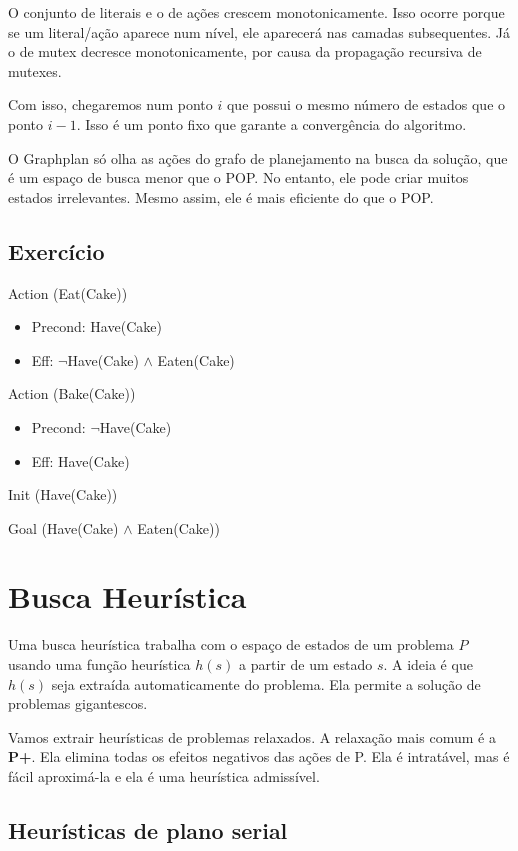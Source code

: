 \documentclass[12pt,letterpaper]{article}
\begin{document}
	O conjunto de literais e o de ações crescem monotonicamente. Isso ocorre porque se um literal/ação aparece num nível, ele aparecerá nas camadas subsequentes. Já o de mutex decresce monotonicamente, por causa da propagação recursiva de mutexes.
	
	Com isso, chegaremos num ponto $i$ que possui o mesmo número de estados que o ponto $i-1$. Isso é um ponto fixo que garante a convergência do algoritmo.
	
	O Graphplan só olha as ações do grafo de planejamento na busca da solução, que é um espaço de busca menor que o POP. No entanto, ele pode criar muitos estados irrelevantes. Mesmo assim, ele é mais eficiente do que o POP.
	
	\subsection*{Exercício}
	
	Action (Eat(Cake))
	\begin{itemize}
		\item Precond: Have(Cake)
		\item Eff: $\lnot$Have(Cake) $\land$ Eaten(Cake)
	\end{itemize}
	
	Action (Bake(Cake))
	\begin{itemize}
		\item Precond: $\lnot$Have(Cake)
		\item Eff: Have(Cake)
	\end{itemize}
	
	Init (Have(Cake))
	
	Goal (Have(Cake) $\land$ Eaten(Cake))
		
	\section*{Busca Heurística}
	
	Uma busca heurística trabalha com o espaço de estados de um problema $P$ usando uma função heurística $h(s)$ a partir de um estado $s$. A ideia é que $h(s)$ seja extraída automaticamente do problema. Ela permite a solução de problemas gigantescos. 
	
	Vamos extrair heurísticas de problemas relaxados. A relaxação mais comum é a \textbf{P+}. Ela elimina todas os efeitos negativos das ações de P. Ela é intratável, mas é fácil aproximá-la e ela é uma heurística admissível.
	
	\subsection*{Heurísticas de plano serial}
	
\end{document}
